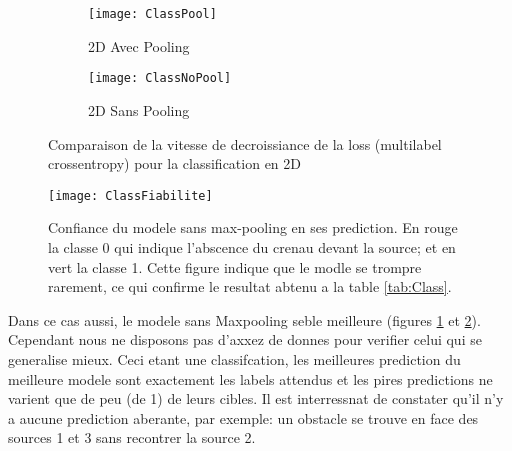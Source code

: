 \begin{figure}[!h]
\begin{subfigure}{.5\textwidth}
\centering
\texttt{[image: ClassPool]}  
\caption[2DPool]{2D Avec Pooling}
\end{subfigure}
\begin{subfigure}{.5\textwidth}
\centering
\texttt{[image: ClassNoPool]}  
\caption[2DNoPool]{2D Sans Pooling}
\end{subfigure}

\centering
\decoRule
\caption[ClassLoss]{Comparaison de la vitesse de decroissiance de la loss (multilabel crossentropy) pour la classification en 2D}
\label{fig:ClassLoss}
\end{figure}


\begin{figure}[H] 
\centering
\texttt{[image: ClassFiabilite]} 
\decoRule
\caption[ClassFiabilite]{Confiance du modele sans max-pooling en ses prediction. En rouge la classe 0 qui indique l'abscence du crenau devant la source; et en vert la classe 1. Cette figure indique que le modle se trompre rarement, ce qui confirme le resultat abtenu a la table \ref{tab:Class}.}
\label{fig:ClassFiabilite}
\end{figure}


Dans ce cas aussi, le modele sans Maxpooling seble meilleure (figures \ref{fig:ClassLoss} et \ref{fig:ClassFiabilite}). Cependant nous ne disposons pas d'axxez de donnes pour verifier celui qui se generalise mieux. Ceci etant une classifcation,  les meilleures prediction du meilleure modele sont exactement les labels attendus et les pires predictions ne varient que de peu (de 1) de leurs cibles. Il est interressnat de constater qu'il n'y a aucune prediction aberante, par exemple: un obstacle se trouve en face des sources 1 et 3 sans recontrer la source 2.

